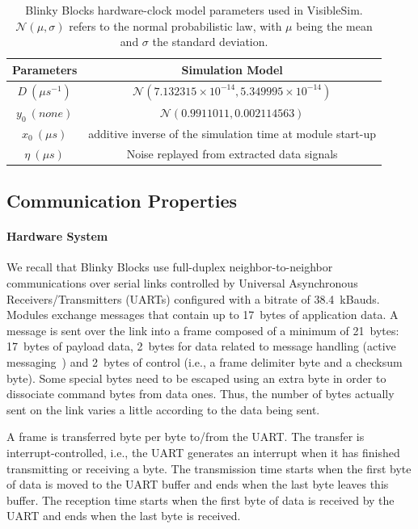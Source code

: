 \begin{table}[h!]
	\begin{center}
		\small
		\begin{tabular}{|c|c|} 
			\hline
			Parameters & Simulation Model \\
			\hline
			$D\ (\mu s^{-1})$ & $\mathcal{N}(7.132315\times10^{-14},5.349995\times10^{-14})$ \\
			\hline
			$y_0\ (none)$ & $\mathcal{N}(0.9911011,0.002114563)$ \\
			\hline
			$x_0\ (\mu s)$ & additive inverse of the simulation time at module start-up \\
			\hline
			$\eta\ (\mu s)$ & Noise replayed from extracted data signals\\
			\hline	
		\end{tabular}		
		\caption{Blinky Blocks hardware-clock model parameters used in VisibleSim.  $\mathcal{N(\mu,\sigma)}$ refers to the normal probabilistic law, with $\mu$ being the mean and $\sigma$ the standard deviation.}
		\label{table:time-sync:clock-parameters}
	\end{center}
\end{table}

\subsection{Communication Properties}
\label{section:time-sync:communication-properties}

\paragraph{Hardware System}

We recall that Blinky Blocks use full-duplex neighbor-to-neighbor communications over serial links controlled by Universal Asynchronous Receivers/Transmitters (UARTs) configured with a bitrate of 38.4~kBauds. Modules exchange messages that contain up to 17~bytes of application data. A message is sent over the link into a frame composed of a minimum of 21~bytes: 17~bytes of payload data, 2~bytes for data related to message handling (active messaging~\cite{eicken1992active}) and 2~bytes of control (i.e., a frame delimiter byte and a checksum byte). Some special bytes need to be escaped using an extra byte in order to dissociate command bytes from data ones. Thus, the number of bytes actually sent on the link varies a little according to the data being sent.

A frame is transferred byte per byte to/from the UART. The transfer is interrupt-controlled, i.e., the UART generates an interrupt when it has finished transmitting or receiving a byte. The transmission time starts when the first byte of data is moved to the UART buffer and ends when the last byte leaves this buffer. The reception time starts when the first byte of data is received by the UART and ends when the last byte is received.

